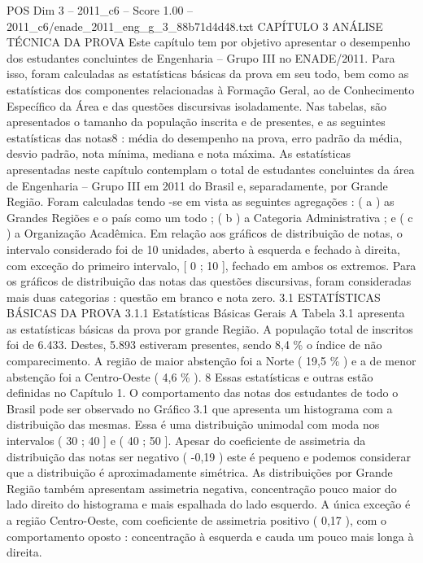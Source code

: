 \begin{textsample}{POS Dim 3 – 2011\_c6 – Score 1.00 – 2011\_c6/enade\_2011\_eng\_g\_3\_88b71d4d48.txt}  \label{ex:f3_pos_208}
CAPÍTULO 3 ANÁLISE TÉCNICA DA PROVA Este capítulo tem por objetivo apresentar o desempenho dos estudantes concluintes de Engenharia – Grupo III no ENADE/2011.
Para isso, foram calculadas as estatísticas básicas da prova em seu todo, bem como as estatísticas dos componentes relacionadas à Formação Geral, ao de Conhecimento Específico da Área e das questões discursivas isoladamente.
Nas tabelas, são apresentados o tamanho da população inscrita e de presentes, e as seguintes estatísticas das notas8 : média do desempenho na prova, erro padrão da média, desvio padrão, nota mínima, mediana e nota máxima.
As estatísticas apresentadas neste capítulo contemplam o total de estudantes concluintes da área de Engenharia – Grupo III em 2011 do Brasil e, separadamente, por Grande Região.
Foram calculadas tendo -se em vista as seguintes agregações : ( a ) as Grandes Regiões e o país como um todo ; ( b ) a Categoria Administrativa ; e ( c ) a Organização Acadêmica.
Em relação aos gráficos de distribuição de notas, o intervalo considerado foi de 10 unidades, aberto à esquerda e fechado à direita, com exceção do primeiro intervalo, [ 0 ; 10 ], fechado em ambos os extremos.
Para os gráficos de distribuição das notas das questões discursivas, foram consideradas mais duas categorias : questão em branco e nota zero. 3.1 ESTATÍSTICAS BÁSICAS DA PROVA 3.1.1 Estatísticas Básicas Gerais A Tabela 3.1 apresenta as estatísticas básicas da prova por grande Região.
A população total de inscritos foi de 6.433.
Destes, 5.893 estiveram presentes, sendo 8,4 \% o índice de não comparecimento.
A região de maior abstenção foi a Norte ( 19,5 \% ) e a de menor abstenção foi a Centro-Oeste ( 4,6 \% ). 8 Essas estatísticas e outras estão definidas no Capítulo 1.
O comportamento das notas dos estudantes de todo o Brasil pode ser observado no Gráfico 3.1 que apresenta um histograma com a distribuição das mesmas.
Essa é uma distribuição unimodal com moda nos intervalos ( 30 ; 40 ] e ( 40 ; 50 ].
Apesar do coeficiente de assimetria da distribuição das notas ser negativo ( -0,19 ) este é pequeno e podemos considerar que a distribuição é aproximadamente simétrica.
As distribuições por Grande Região também apresentam assimetria negativa, concentração pouco maior do lado direito do histograma e mais espalhada do lado esquerdo.
A única exceção é a região Centro-Oeste, com coeficiente de assimetria positivo ( 0,17 ), com o comportamento oposto : concentração à esquerda e cauda um pouco mais longa à direita.

\end{textsample}
